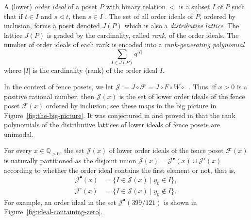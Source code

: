 \documentclass[a4paper,12pt]{amsart}
\newcommand{\Q}{\mathbb{Q}}
\newcommand{\xx}{{x}}
\newcommand{\Fcal}{{\mathcal{F}}}
\newcommand{\Jcal}{{\mathcal{J}}}
\newcommand{\0}{\mathtt{0}}
\newcommand{\1}{\mathtt{1}}
\newcommand{\2}{\mathtt{2}}
\newcommand{\3}{\mathtt{3}}
\DeclareMathOperator{\CFeven}{{CF_{\text{even}}}}
\begin{document}
A (lower) \emph{order ideal}
of a poset $P$ with binary relation $\vartriangleleft$
is a subset $I$ of $P$ such that if $t\in I$
and $s \vartriangleleft t$, then $s\in I$ \cite{MR2868112}.
%
%
The set of all order ideals of $P$, ordered by inclusion, forms a poset denoted
$J(P)$ which is also a \emph{distributive lattice}.
The lattice $J(P)$ is graded by
the cardinality, called \emph{rank}, of the order ideals.
The number of order ideals of each rank is encoded into a \emph{rank-generating polynomial}
\[
    \sum_{I\in J(P)} q^{|I|}
\]
where $|I|$ is the cardinality (rank) of the order ideal $I$.

In the context of fence posets,
we let $\Jcal:=J\circ\Fcal = J\circ F\circ W\circ\CFeven$.
Thus, if $\xx>0$ is a positive rational number, then
$\Jcal(\xx)$ is the set of lower order ideals of the fence poset $\Fcal(\xx)$
ordered by inclusion;
see these maps in the big picture in Figure~\ref{fig:the-big-picture}.
It was conjectured in \cite{MR4073883} and
proved in \cite{MR4499341} that the rank polynomials of the distributive
lattices of lower ideals of fence posets are unimodal.

For every $\xx\in\Q_{>0}$,
the set $\Jcal(\xx)$ of lower order ideals of the fence poset $\Fcal(\xx)$
is naturally partitioned as the disjoint union
$\Jcal(\xx)=\Jcal^\bullet(\xx)\cup\Jcal^\circ  (\xx)$
according to whether the order ideal contains the first element or not,
that is,
\begin{align*}
    \Jcal^\bullet(\xx) &= \{I\in\Jcal(\xx) \mid y_0\in    I\},\\
    \Jcal^\circ  (\xx) &= \{I\in\Jcal(\xx) \mid y_0\notin I\}.
\end{align*}
For example, an order ideal in the set $\Jcal^\bullet(399/121)$ is
shown in Figure~\ref{fig:ideal-containing-zero}.
\end{document}
